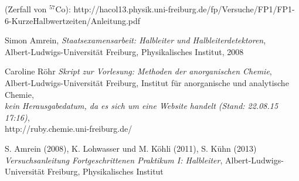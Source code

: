 \documentclass[12pt]{article}
\begin{document}

\newpage
\listoffigures


\newpage
\thispagestyle{empty}
\begin{thebibliography}{9}

 (Zerfall von $^{57}$Co): http://hacol13.physik.uni-freiburg.de/fp/Versuche/FP1/FP1-6-KurzeHalbwertzeiten/Anleitung.pdf
  
  	Simon Amrein,
  	\emph{Staatsexamensarbeit: Halbleiter und Halbleiterdetektoren},\\
  	Albert-Ludwigs-Universität Freiburg,
  	Physikalisches Institut,
  	2008

	Caroline Röhr
	\emph{Skript zur Vorlesung: Methoden der anorganischen Chemie},\\
	Albert-Ludwigs-Universität Freiburg,
	Institut für anorganische und analytische Chemie,\\
	\emph{kein Herausgabedatum, da es sich um eine Website handelt (Stand: 22.08.15 17:16)},\\
	http://ruby.chemie.uni-freiburg.de/

  	S. Amrein (2008), K. Lohwasser und M. Köhli (2011), S. Kühn (2013)
  	\emph{Versuchsanleitung Fortgeschrittenen Praktikum I: Halbleiter},
  	Albert-Ludwigs-Universität Freiburg,
  	Physikalisches Institut
  
  

\end{thebibliography}
\end{document}
